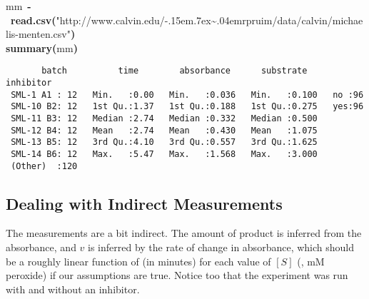\documentclass{article}\usepackage{graphicx, color}
\makeatletter
\newcommand{\hlfunctioncall}[1]{\textcolor[rgb]{0.501960784313725,0,0.329411764705882}{\textbf{#1}}}%
\newcommand{\hlstring}[1]{\textcolor[rgb]{0.6,0.6,1}{#1}}%
\newcommand{\hlkeyword}[1]{\textcolor[rgb]{0,0,0}{\textbf{#1}}}%
\newcommand{\hlassignement}[1]{\textcolor[rgb]{0,0,0}{\textbf{#1}}}%
\newcommand{\hlsymbol}[1]{\textcolor[rgb]{0,0,0}{#1}}%
\def\urltilda{\kern -.15em\lower .7ex\hbox{\~{}}\kern .04em}%
\newcommand{\hlstd}[1]{\textcolor[rgb]{0,0,0}{#1}}%
\newenvironment{kframe}{%
 \def\FrameCommand##1{\hskip\@totalleftmargin \hskip-\fboxsep
 \colorbox{shadecolor}{##1}\hskip-\fboxsep
     \hskip-\linewidth \hskip-\@totalleftmargin \hskip\columnwidth}%
 \MakeFramed {\advance\hsize-\width
   \@totalleftmargin\z@ \linewidth\hsize
   \@setminipage}}%
 {\par\unskip\endMakeFramed}
\newenvironment{knitrout}{}{} %
\makeatother
\begin{document}
\begin{knitrout}
\color{fgcolor}\begin{kframe}
\begin{flushleft}
\ttfamily\noindent
\hlsymbol{mm}{\ }\hlassignement{\usebox{\hlnormalsizeboxlessthan}-}{\ }\hlfunctioncall{read.csv}\hlkeyword{(}\hlstring{"{}{}http://www.calvin.edu/\urltilda{}rpruim/data/calvin/michaelis-menten.csv"{}{}}\hlkeyword{)}\hspace*{\fill}\\
\hlstd{}\hlfunctioncall{summary}\hlkeyword{(}\hlsymbol{mm}\hlkeyword{)}\mbox{}
\normalfont
\end{flushleft}
\begin{verbatim}
       batch          time        absorbance      substrate     inhibitor
 SML-1 A1 : 12   Min.   :0.00   Min.   :0.036   Min.   :0.100   no :96   
 SML-10 B2: 12   1st Qu.:1.37   1st Qu.:0.188   1st Qu.:0.275   yes:96   
 SML-11 B3: 12   Median :2.74   Median :0.332   Median :0.500            
 SML-12 B4: 12   Mean   :2.74   Mean   :0.430   Mean   :1.075            
 SML-13 B5: 12   3rd Qu.:4.10   3rd Qu.:0.557   3rd Qu.:1.625            
 SML-14 B6: 12   Max.   :5.47   Max.   :1.568   Max.   :3.000            
 (Other)  :120                                                           
\end{verbatim}
\end{kframe}
\end{knitrout}


\subsection{Dealing with Indirect Measurements}
The measurements are a bit indirect.  The amount of product is inferred from
the absorbance, and $v$ is inferred by the rate of change in absorbance, which
should be a roughly linear function of  (in minutes) for each
value of $[S]$ (, mM peroxide) if our assumptions are true.
Notice too that the experiment was run with and without an inhibitor.
\end{document}
